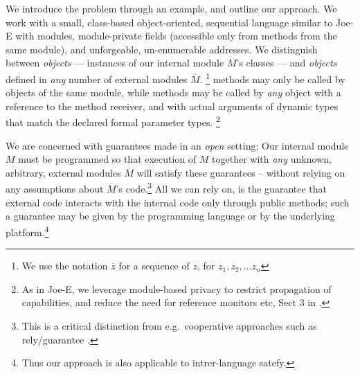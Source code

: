  \newcommand{\pwd}{key}

\renewcommand{\password}{key\xspace}

We introduce the problem  through an example, and outline our
approach.  We work with a  small, class-based object-oriented, sequential language similar to Joe-E \cite{JoeE} with modules,   module-private fields
({accessible} only from   methods {from} the same module),
and unforgeable, un-enumerable addresses.
We distinguish between  \emph{\internalO  objects} --- instances of our internal module $M$'s classes ---
and \emph{\externalO  objects} defined in
\emph{any} number of external modules $\overline M$.%
\!\footnote{We use the notation $\overline z$ for a sequence of $z$, \ie for $z_1,z_2,...z_n$ }
{ methods  {may only be} called by objects of the same
  module,  while   methods  may be {called} by \emph{any}
  object with a reference to the method receiver, {and with
  actual arguments of  dynamic types that match} the declared formal parameter types.}%
\!\footnote{As in Joe-E, we leverage  module-based privacy to restrict propagation of capabilities, and reduce the need for reference monitors etc, \cf Sect 3 in  \cite{JoeE}.}   

\label{s:concepts}
 
We are concerned with guarantees made in an \emph{open} setting; %
Our internal module
$M$ must be programmed so that 
  execution of $M$  together with \emph{any} unknown, arbitrary, external modules $\overline M$
will satisfy these guarantees --
without relying on any assumptions about $\overline M$'s code.\footnote{This is a critical distinction from e.g.\
cooperative approaches such as rely/guarantee
\cite{relyGuarantee-HayesJones-setss2017,relyGuarantee-vanStaden-mpc2015}.}
All we can rely on, is the guarantee that external code interacts with the internal code only through public methods; such a guarantee may be given by the programming language or by the underlying platform.\footnote{Thus our approach is also applicable to intrer-language satefy.}
  

